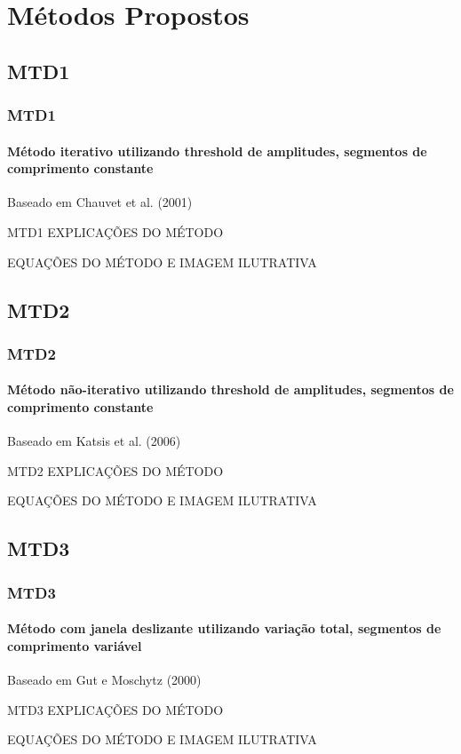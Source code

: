 \documentclass{beamer}
\begin{document}
	\section[Métodos Propostos]{Métodos Propostos}
	
	\subsection[MTD1]{MTD1}
	\begin{frame}
		\frametitle{MTD1}
		\framesubtitle{Método iterativo utilizando threshold de amplitudes, segmentos de comprimento constante}
		
		Baseado em Chauvet et al. (2001)
		
		\begin{block}{MTD1}
			EXPLICAÇÕES DO MÉTODO
		\end{block}
		
		EQUAÇÕES DO MÉTODO E IMAGEM ILUTRATIVA
		
	\end{frame}
	
	
	\subsection[MTD2]{MTD2}
	\begin{frame}
		\frametitle{MTD2}
		\framesubtitle{Método não-iterativo utilizando threshold de amplitudes, segmentos de comprimento constante}
		
		Baseado em Katsis et al. (2006)
		
		\begin{block}{MTD2}
			EXPLICAÇÕES DO MÉTODO
		\end{block}
		
		EQUAÇÕES DO MÉTODO E IMAGEM ILUTRATIVA
		
	\end{frame}
	
	\subsection[MTD3]{MTD3}
	\begin{frame}
		\frametitle{MTD3}
		\framesubtitle{Método com janela deslizante utilizando variação total, segmentos de comprimento variável}
		
		Baseado em Gut e Moschytz (2000)
		
		\begin{block}{MTD3}
			EXPLICAÇÕES DO MÉTODO
		\end{block}
		
		EQUAÇÕES DO MÉTODO E IMAGEM ILUTRATIVA
		
	\end{frame}
	
\end{document}
